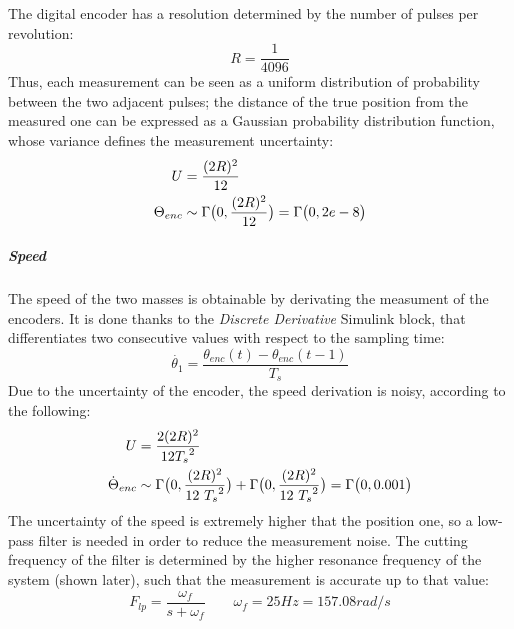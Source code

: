 The digital encoder has a resolution determined by the number of pulses per revolution:
\[
	R = \frac{1}{4096}
\]
Thus, each measurement can be seen as a uniform distribution of probability between the two adjacent pulses; the distance of the true position from the measured one can be expressed as a Gaussian probability distribution function, whose variance defines the measurement uncertainty:
\begin{align*}
	U &= \frac{(2R)^2}{12} \\
	\Theta_{enc} &\sim \Gamma \bigl{(} 0,\frac{(2R)^2}{12} \bigr{)} = \Gamma \bigl{(} 0, 2e-8 \bigr{)}
\end{align*}

\subparagraph{Speed}

The speed of the two masses is obtainable by derivating the measument of the encoders. It is done thanks to the \textit{Discrete Derivative} Simulink block, that differentiates two consecutive values with respect to the sampling time:
\[
	\dot{\theta_1} = \frac{ \theta_{enc}(t) - \theta_{enc}(t-1)}{T_s}
\]
Due to the uncertainty of the encoder, the speed derivation is noisy, according to the following:
\begin{align*}
	U &= \frac{2(2R)^2}{12 {T_s}^2 } \\
	\dot{\Theta}_{enc}	&\sim \Gamma \bigl{(} 0,\frac{(2R)^2}{12 \ {T_s}^2} \bigr{)} + \Gamma \bigl{(} 0,\frac{(2R)^2}{12 \ {T_s}^2} \bigr{)} = \Gamma \bigl{(} 0, 0.001 \bigr{)}
\end{align*}
The uncertainty of the speed is extremely higher that the position one, so a low-pass filter is needed in order to reduce the measurement noise. The cutting frequency of the filter is determined by the higher resonance frequency of the system (shown later), such that the measurement is accurate up to that value:
\[
	F_{lp} = \frac{ \omega_f }{ s+\omega_f} \qquad \omega_f=25Hz=157.08 rad/s
\]